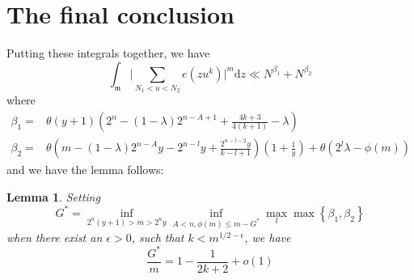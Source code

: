 \documentclass[10pt]{article}
\newtheorem{lemma}{Lemma}[section]
\begin{document}
\section{The final conclusion}
Putting these integrals together, we have
\[
\int_{\mathfrak{m}}\bigg|\sum\limits_{{N_1}<u<{N_2}}{e(zu^k)}\bigg|^{m}\mathrm{d}z\ll N^{\beta_1}+N^{\beta_2}
\]
where
\begin{align*}
\beta_1=&\theta(y+1)(2^n-(1-\lambda)2^{n-A+1}+\frac{4k+3}{4(k+1)}-\lambda)\\
\beta_2=&\theta(m-(1-\lambda)2^{n-A}y-2^{n-l}y+\frac{2^{n-l-2}y}{k-l+1})(1+\frac{1}{y})+\theta(2^l\lambda-\phi(m))
\end{align*}
and we have the lemma follows:
\begin{lemma}
Setting
\[
G^*=\inf\limits_{2^n(y+1)>m>2^ny}\inf\limits_{A<n,\phi(m)\leq m-G^*}\max\limits_{l}\max\left\{\beta_1,\beta_2\right\}
\]
when there exist an $\epsilon>0$, such that $k<m^{1/2-\epsilon}$, we have
\[
\frac{G^*}{m}=1-\frac{1}{2k+2}+o(1)
\]
\end{lemma}
\end{document}
